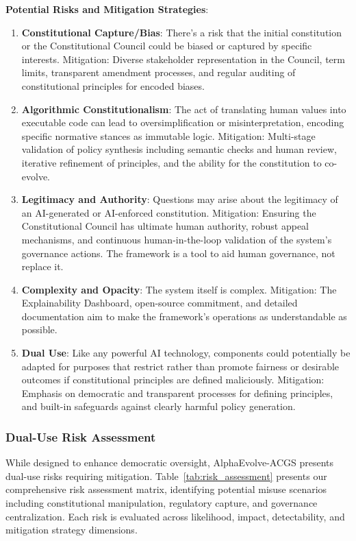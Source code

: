 \documentclass[manuscript,screen,review,anonymous,9pt]{acmart}
\begin{document}
\textbf{Potential Risks and Mitigation Strategies}:
\begin{enumerate}
	\item \textbf{Constitutional Capture/Bias}: There's a risk that the initial constitution or the Constitutional Council could be biased or captured by specific interests. Mitigation: Diverse stakeholder representation in the Council, term limits, transparent amendment processes, and regular auditing of constitutional principles for encoded biases.
	\item \textbf{Algorithmic Constitutionalism}: The act of translating human values into executable code can lead to oversimplification or misinterpretation, encoding specific normative stances as immutable logic. Mitigation: Multi-stage validation of policy synthesis including semantic checks and human review, iterative refinement of principles, and the ability for the constitution to co-evolve.
	\item \textbf{Legitimacy and Authority}: Questions may arise about the legitimacy of an AI-generated or AI-enforced constitution. Mitigation: Ensuring the Constitutional Council has ultimate human authority, robust appeal mechanisms, and continuous human-in-the-loop validation of the system's governance actions. The framework is a tool to aid human governance, not replace it.
	\item \textbf{Complexity and Opacity}: The system itself is complex. Mitigation: The Explainability Dashboard, open-source commitment, and detailed documentation aim to make the framework's operations as understandable as possible.
	\item \textbf{Dual Use}: Like any powerful AI technology, components could potentially be adapted for purposes that restrict rather than promote fairness or desirable outcomes if constitutional principles are defined maliciously. Mitigation: Emphasis on democratic and transparent processes for defining principles, and built-in safeguards against clearly harmful policy generation.
\end{enumerate}

\subsubsection{Dual-Use Risk Assessment}
\label{subsubsec:dual_use_risks}
While designed to enhance democratic oversight, AlphaEvolve-ACGS presents dual-use risks requiring mitigation. Table~\ref{tab:risk_assessment} presents our comprehensive risk assessment matrix, identifying potential misuse scenarios including constitutional manipulation, regulatory capture, and governance centralization. Each risk is evaluated across likelihood, impact, detectability, and mitigation strategy dimensions.
\end{document}
